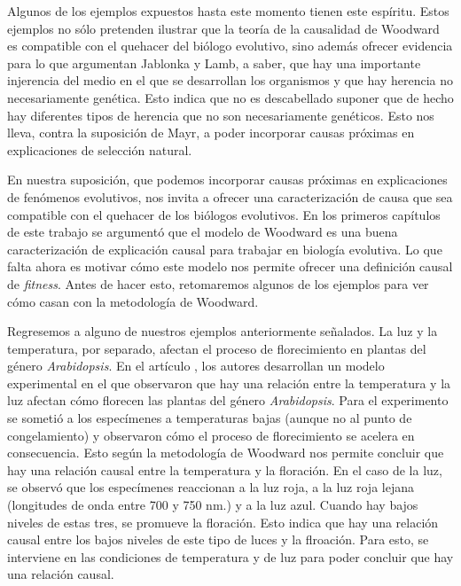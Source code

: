 Algunos de los ejemplos expuestos hasta este momento tienen este espíritu. Estos ejemplos no sólo pretenden ilustrar que la teoría de la causalidad de Woodward es compatible con el quehacer del biólogo evolutivo, sino además ofrecer evidencia para lo que argumentan Jablonka y Lamb, a saber, que hay una importante injerencia del medio en el que se desarrollan los organismos y que hay herencia no necesariamente genética. Esto indica que no es descabellado suponer que de hecho hay diferentes tipos de herencia que no son necesariamente genéticos. Esto nos lleva, contra la suposición de Mayr, a poder incorporar causas próximas en explicaciones de selección natural.

En nuestra suposición, que podemos incorporar causas próximas en explicaciones de fenómenos evolutivos, nos invita a ofrecer una caracterización de causa que sea compatible con el quehacer de los biólogos evolutivos. En los primeros capítulos de este trabajo se argumentó que el modelo de Woodward es una buena caracterización de explicación causal para trabajar en biología evolutiva. Lo que falta ahora es motivar cómo este modelo nos permite ofrecer una definición causal de \emph{fitness}. Antes de hacer esto, retomaremos algunos de los ejemplos para ver cómo casan con la metodología de Woodward.

Regresemos a alguno de nuestros ejemplos anteriormente señalados. La luz y la temperatura, por separado,  afectan el proceso de florecimiento en plantas del género \emph{Arabidopsis}. En el artículo \cite{AusinEnviro}, los autores desarrollan un modelo experimental en el que observaron que hay una relación entre la temperatura y la luz afectan cómo florecen las plantas del género \emph{Arabidopsis}. Para el experimento se sometió a los especímenes a temperaturas bajas (aunque no al punto de congelamiento) y observaron cómo el proceso de florecimiento se acelera en consecuencia. Esto según la metodología de Woodward nos permite concluir que hay una relación causal entre la temperatura y la floración. En el caso de la luz, se observó que los especímenes reaccionan a la luz roja, a la luz roja lejana (longitudes de onda entre 700 y 750 nm.) y a la luz azul. Cuando hay bajos niveles de estas tres, se promueve la floración. Esto indica que hay una relación causal entre los bajos niveles de este tipo de luces y la flroación. Para esto, se interviene en las condiciones de temperatura y de luz para poder concluir que hay una relación causal.

\begin{center}
\end{center}

